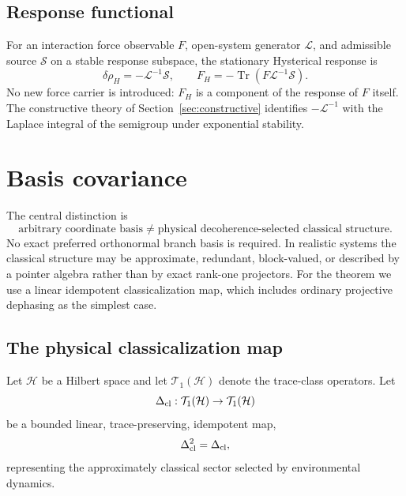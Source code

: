 \documentclass[11pt]{article}
\theoremstyle{definition}
\theoremstyle{remark}
\newcommand{\Tr}{\operatorname{Tr}}
\begin{document}
\subsection{Response functional}
For an interaction force observable $F$, open-system generator $\mathcal L$, and admissible source $\mathcal S$ on a stable response subspace, the stationary Hysterical response is
\begin{equation}
  \delta\rho_H=-\mathcal L^{-1}\mathcal S,\qquad
  F_H=-\Tr\!\left(F\mathcal L^{-1}\mathcal S\right).
  \label{eq:response-def}
\end{equation}
No new force carrier is introduced: $F_H$ is a component of the response of $F$ itself.
The constructive theory of Section~\ref{sec:constructive} identifies $-\mathcal L^{-1}$ with the Laplace integral of the semigroup under exponential stability.

\section{Basis covariance}
\label{sec:basis}
The central distinction is
\begin{equation}
 \boxed{\text{arbitrary coordinate basis}\neq\text{physical decoherence-selected classical structure}.}
 \label{eq:keydist}
\end{equation}
No exact preferred orthonormal branch basis is required. In realistic systems the classical structure may be approximate, redundant, block-valued, or described by a pointer algebra rather than by exact rank-one projectors. For the theorem we use a linear idempotent classicalization map, which includes ordinary projective dephasing as the simplest case.

\subsection{The physical classicalization map}
Let $\mathcal H$ be a Hilbert space and let $\mathcal T_1(\mathcal H)$ denote the trace-class operators. Let
\begin{equation}
 \Delta_{\rm cl}:\mathcal T_1(\mathcal H)\to\mathcal T_1(\mathcal H)
\end{equation}
be a bounded linear, trace-preserving, idempotent map,
\begin{equation}
 \Delta_{\rm cl}^2=\Delta_{\rm cl},
 \label{eq:idempotent}
\end{equation}
representing the approximately classical sector selected by environmental dynamics.
\end{document}
